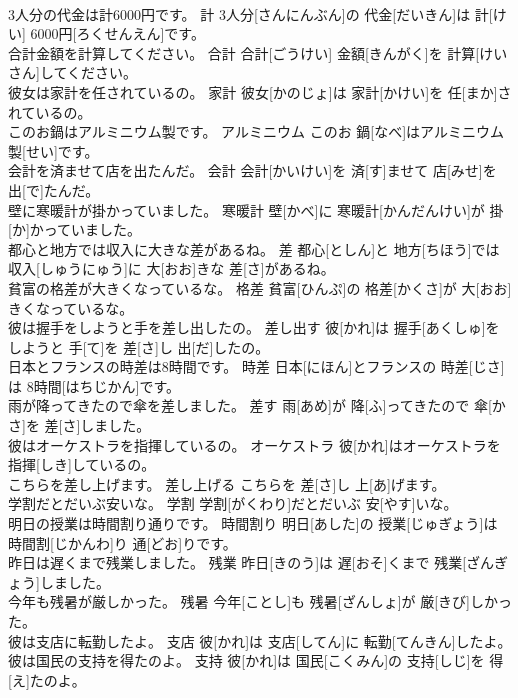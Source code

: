 \documentclass[8pt]{extreport}
\begin{document}
\begin{CJK}{UTF8}{min}
\\	3人分の代金は計6000円です。	計	3人分[さんにんぶん]の 代金[だいきん]は 計[けい] 6000円[ろくせんえん]です。	
\\	合計金額を計算してください。	合計	合計[ごうけい] 金額[きんがく]を 計算[けいさん]してください。	
\\	彼女は家計を任されているの。	家計	彼女[かのじょ]は 家計[かけい]を 任[まか]されているの。	
\\	このお鍋はアルミニウム製です。	アルミニウム	このお 鍋[なべ]はアルミニウム 製[せい]です。	
\\	会計を済ませて店を出たんだ。	会計	会計[かいけい]を 済[す]ませて 店[みせ]を 出[で]たんだ。	
\\	壁に寒暖計が掛かっていました。	寒暖計	壁[かべ]に 寒暖計[かんだんけい]が 掛[か]かっていました。	
\\	都心と地方では収入に大きな差があるね。	差	都心[としん]と 地方[ちほう]では 収入[しゅうにゅう]に 大[おお]きな 差[さ]があるね。	
\\	貧富の格差が大きくなっているな。	格差	貧富[ひんぷ]の 格差[かくさ]が 大[おお]きくなっているな。	
\\	彼は握手をしようと手を差し出したの。	差し出す	彼[かれ]は 握手[あくしゅ]をしようと 手[て]を 差[さ]し 出[だ]したの。	
\\	日本とフランスの時差は8時間です。	時差	日本[にほん]とフランスの 時差[じさ]は 8時間[はちじかん]です。	
\\	雨が降ってきたので傘を差しました。	差す	雨[あめ]が 降[ふ]ってきたので 傘[かさ]を 差[さ]しました。	
\\	彼はオーケストラを指揮しているの。	オーケストラ	彼[かれ]はオーケストラを 指揮[しき]しているの。	
\\	こちらを差し上げます。	差し上げる	こちらを 差[さ]し 上[あ]げます。	
\\	学割だとだいぶ安いな。	学割	学割[がくわり]だとだいぶ 安[やす]いな。	
\\	明日の授業は時間割り通りです。	時間割り	明日[あした]の 授業[じゅぎょう]は 時間割[じかんわ]り 通[どお]りです。	
\\	昨日は遅くまで残業しました。	残業	昨日[きのう]は 遅[おそ]くまで 残業[ざんぎょう]しました。	
\\	今年も残暑が厳しかった。	残暑	今年[ことし]も 残暑[ざんしょ]が 厳[きび]しかった。	
\\	彼は支店に転勤したよ。	支店	彼[かれ]は 支店[してん]に 転勤[てんきん]したよ。	
\\	彼は国民の支持を得たのよ。	支持	彼[かれ]は 国民[こくみん]の 支持[しじ]を 得[え]たのよ。	

\end{CJK}
\end{document}
